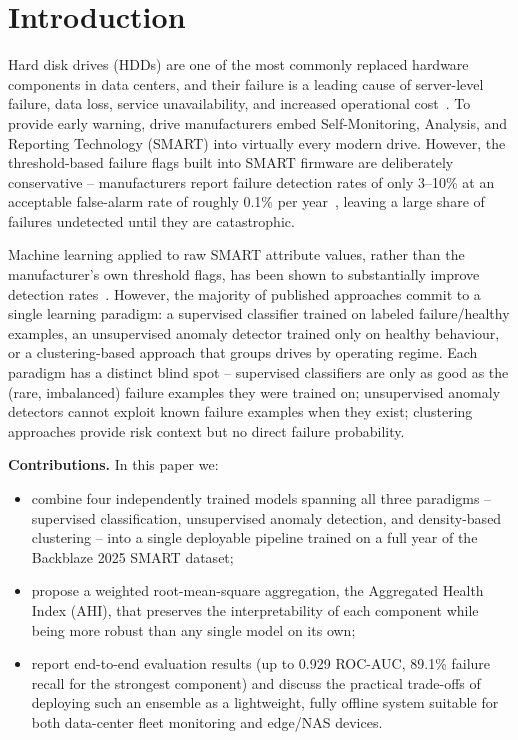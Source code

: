 \documentclass[sigconf,natbib=false, language=english]{acmart}
\begin{document}
\maketitle

\section{Introduction}
\label{sec:introduction}

Hard disk drives (HDDs) are one of the most commonly replaced hardware components in data centers, and their failure is a leading cause of server-level failure, data loss, service unavailability, and increased operational cost~\cite{lu2020smarter}. To provide early warning, drive manufacturers embed Self-Monitoring, Analysis, and Reporting Technology (SMART) into virtually every modern drive. However, the threshold-based failure flags built into SMART firmware are deliberately conservative -- manufacturers report failure detection rates of only 3--10\% at an acceptable false-alarm rate of roughly 0.1\% per year~\cite{murray2005}, leaving a large share of failures undetected until they are catastrophic.

Machine learning applied to raw SMART attribute values, rather than the manufacturer's own threshold flags, has been shown to substantially improve detection rates~\cite{murray2005,lu2020smarter}. However, the majority of published approaches commit to a single learning paradigm: a supervised classifier trained on labeled failure/healthy examples, an unsupervised anomaly detector trained only on healthy behaviour, or a clustering-based approach that groups drives by operating regime. Each paradigm has a distinct blind spot -- supervised classifiers are only as good as the (rare, imbalanced) failure examples they were trained on; unsupervised anomaly detectors cannot exploit known failure examples when they exist; clustering approaches provide risk context but no direct failure probability.

\textbf{Contributions.} In this paper we:
\begin{itemize}
    \item combine four independently trained models spanning all three paradigms -- supervised classification, unsupervised anomaly detection, and density-based clustering -- into a single deployable pipeline trained on a full year of the Backblaze 2025 SMART dataset;
    \item propose a weighted root-mean-square aggregation, the Aggregated Health Index (AHI), that preserves the interpretability of each component while being more robust than any single model on its own;
    \item report end-to-end evaluation results (up to 0.929 ROC-AUC, 89.1\% failure recall for the strongest component) and discuss the practical trade-offs of deploying such an ensemble as a lightweight, fully offline system suitable for both data-center fleet monitoring and edge/NAS devices.
\end{itemize}
\end{document}
